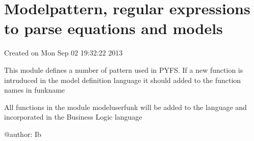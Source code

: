 \documentclass[letterpaper,10pt,english]{sphinxmanual}
\begin{document}
\section{Modelpattern, regular expressions to parse equations and models}
\label{\detokenize{index:module-modelpattern}}\label{\detokenize{index:modelpattern-regular-expressions-to-parse-equations-and-models}}
\sphinxAtStartPar
Created on Mon Sep 02 19:32:22 2013

\sphinxAtStartPar
This module defines a number of pattern used in PYFS.
If a new function is intruduced in the model definition language it should added to the
function names in funkname

\sphinxAtStartPar
All functions in the module modeluserfunk will be added to the language and incorporated in the Business
Logic language

\sphinxAtStartPar
@author: Ib
\end{document}

